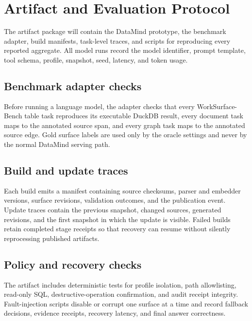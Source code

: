 
\section{Artifact and Evaluation Protocol}
\label{app:protocol}

The artifact package will contain the DataMind prototype, the benchmark
adapter, build manifests, task-level traces, and scripts for reproducing every
reported aggregate. All model runs record the model identifier, prompt
template, tool schema, profile, snapshot, seed, latency, and token usage.

\subsection{Benchmark adapter checks}
\label{app:adapter}

Before running a language model, the adapter checks that every WorkSurface-Bench
table task reproduces its executable DuckDB result, every document task maps to
the annotated source span, and every graph task maps to the annotated source
edge. Gold surface labels are used only by the oracle settings and never by
the normal DataMind serving path.

\subsection{Build and update traces}
\label{app:build-traces}

Each build emits a manifest containing source checksums, parser and embedder
versions, surface revisions, validation outcomes, and the publication event.
Update traces contain the previous snapshot, changed sources, generated
revisions, and the first snapshot in which the update is visible. Failed builds
retain completed stage receipts so that recovery can resume without silently
reprocessing published artifacts.

\subsection{Policy and recovery checks}
\label{app:policy}

The artifact includes deterministic tests for profile isolation, path
allowlisting, read-only SQL, destructive-operation confirmation, and audit
receipt integrity. Fault-injection scripts disable or corrupt one surface at a
time and record fallback decisions, evidence receipts, recovery latency, and
final answer correctness.

